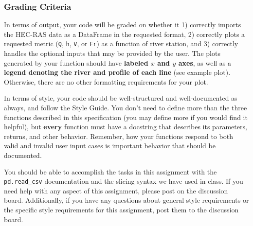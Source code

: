 \documentclass{homework}
\begin{document}
\subsubsection*{Grading Criteria}

In terms of output, your code will be graded on whether it 1) correctly imports the HEC-RAS data as a DataFrame in the requested format, 2) correctly plots a requested metric (\texttt{Q}, \texttt{h}, \texttt{V}, or \texttt{Fr}) as a function of river station, and 3) correctly handles the optional inputs that may be provided by the user. The plots generated by your function should have \textbf{labeled $x$ and $y$ axes}, as well as a \textbf{legend denoting the river and profile of each line} (see example plot). Otherwise, there are no other formatting requirements for your plot.

In terms of style, your code should be well-structured and well-documented as always, and follow the Style Guide. You don't need to define more than the three functions described in this specification (you may define more if you would find it helpful), but \textbf{every} function must have a docstring that describes its parameters, returns, and other behavior. Remember, how your functions respond to both valid and invalid user input cases is important behavior that should be documented.

You should be able to accomplish the tasks in this assignment with the \texttt{pd.read\_csv} documentation and the slicing syntax we have used in class. If you need help with any aspect of this assignment, please post on the discussion board. Additionally, if you have any questions about general style requirements or the specific style requirements for this assignment, post them to the discussion board.
\end{document}
